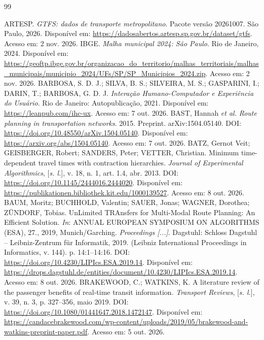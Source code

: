 \documentclass[12pt,oneside,a4paper,brazil,chapter=TITLE]{abntex2}
\begin{document}
\postextual
\begin{thebibliography}{99}
\SingleSpacing\raggedright
{} ARTESP. \textit{GTFS: dados de transporte metropolitano}. Pacote versão 20261007. São Paulo, 2026. Disponível em: \url{https://dadosabertos.artesp.sp.gov.br/dataset/gtfs}. Acesso em: 2 nov. 2026.
 IBGE. \textit{Malha municipal 2024: São Paulo}. Rio de Janeiro, 2024. Disponível em: \url{https://geoftp.ibge.gov.br/organizacao_do_territorio/malhas_territoriais/malhas_municipais/municipio_2024/UFs/SP/SP_Municipios_2024.zip}. Acesso em: 2 nov. 2026.
\setlength{\bibsep}{\baselineskip}
 BARBOSA, S. D. J.; SILVA, B. S.; SILVEIRA, M. S.; GASPARINI, I.; DARIN, T.; BARBOSA, G. D. J. \textit{Interação Humano-Computador e Experiência do Usuário}. Rio de Janeiro: Autopublicação, 2021. Disponível em: \url{https://leanpub.com/ihc-ux}. Acesso em: 7 out. 2026.
 BAST, Hannah \textit{et al.} \textit{Route planning in transportation networks}. 2015. Preprint. arXiv:1504.05140. DOI: \url{https://doi.org/10.48550/arXiv.1504.05140}. Disponível em: \url{https://arxiv.org/abs/1504.05140}. Acesso em: 7 out. 2026.
 BATZ, Gernot Veit; GEISBERGER, Robert; SANDERS, Peter; VETTER, Christian. Minimum time-dependent travel times with contraction hierarchies. \textit{Journal of Experimental Algorithmics}, [\textit{s. l.}], v. 18, n. 1, art. 1.4, abr. 2013. DOI: \url{https://doi.org/10.1145/2444016.2444020}. Disponível em: \url{https://publikationen.bibliothek.kit.edu/1000139527}. Acesso em: 8 out. 2026.
 BAUM, Moritz; BUCHHOLD, Valentin; SAUER, Jonas; WAGNER, Dorothea; ZÜNDORF, Tobias. UnLimited TRAnsfers for Multi-Modal Route Planning: An Efficient Solution. \textit{In}: ANNUAL EUROPEAN SYMPOSIUM ON ALGORITHMS (ESA), 27., 2019, Munich/Garching. \textit{Proceedings [...]}. Dagstuhl: Schloss Dagstuhl -- Leibniz-Zentrum für Informatik, 2019. (Leibniz International Proceedings in Informatics, v. 144). p. 14:1--14:16. DOI: \url{https://doi.org/10.4230/LIPIcs.ESA.2019.14}. Disponível em: \url{https://drops.dagstuhl.de/entities/document/10.4230/LIPIcs.ESA.2019.14}. Acesso em: 8 out. 2026.
 BRAKEWOOD, C.; WATKINS, K. A literature review of the passenger benefits of real-time transit information. \textit{Transport Reviews}, [\textit{s. l.}], v. 39, n. 3, p. 327--356, maio 2019. DOI: \url{https://doi.org/10.1080/01441647.2018.1472147}. Disponível em: \url{https://candacebrakewood.com/wp-content/uploads/2019/05/brakewood-and-watkins-preprint-paper.pdf}. Acesso em: 5 out. 2026.

\end{thebibliography}
\end{document}
